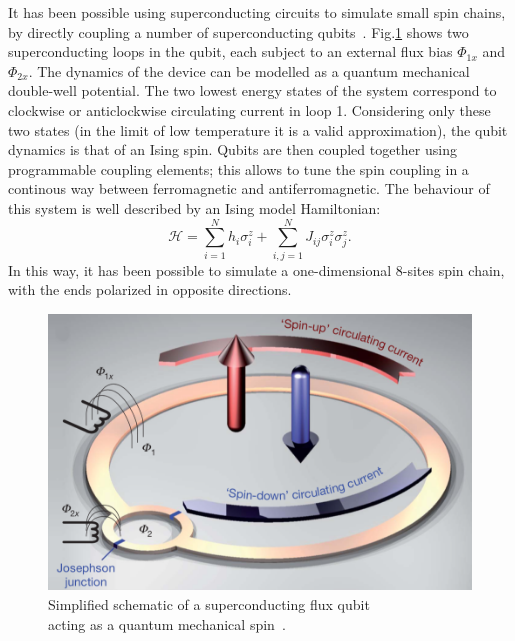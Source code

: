 It has been possible using superconducting circuits to simulate small spin chains, by directly coupling a number of superconducting qubits~\cite{8spinChain_simulatedByQubits}. Fig.\ref{fig:superconductinCircuit_SpinSystem} shows two superconducting loops in the qubit, each subject to an external flux bias $\Phi_{1x}$ and $\Phi_{2x}$. The dynamics of the device can be modelled as a quantum mechanical double-well potential. The two lowest energy states of the system correspond to clockwise or anticlockwise circulating current in loop 1. Considering only these two states (in the limit of low temperature it is a valid approximation), the qubit dynamics is that of an Ising spin. Qubits are then coupled together using programmable coupling elements; this allows to tune the spin coupling in a continous way between ferromagnetic and antiferromagnetic. The behaviour of this system is well described by an Ising model Hamiltonian:
\begin{equation*}
    \mathcal{H} = \sum_{i=1}^{N} h_i\sigma_i^z + \sum_{i,j=1}^{N} J_{ij}\sigma_i^z\sigma_j^z.
\end{equation*}
In this way, it has been possible to simulate a one-dimensional 8-sites spin chain, with the ends polarized in opposite directions.

\begin{figure}
    \centering
    \includegraphics[scale=0.5]{Figures/superconductinCircuit_SpinSystem.png}
    \caption{Simplified schematic of a superconducting flux qubit \\acting as a quantum mechanical spin~\cite{8spinChain_simulatedByQubits}.}
    \label{fig:superconductinCircuit_SpinSystem}
\end{figure}
